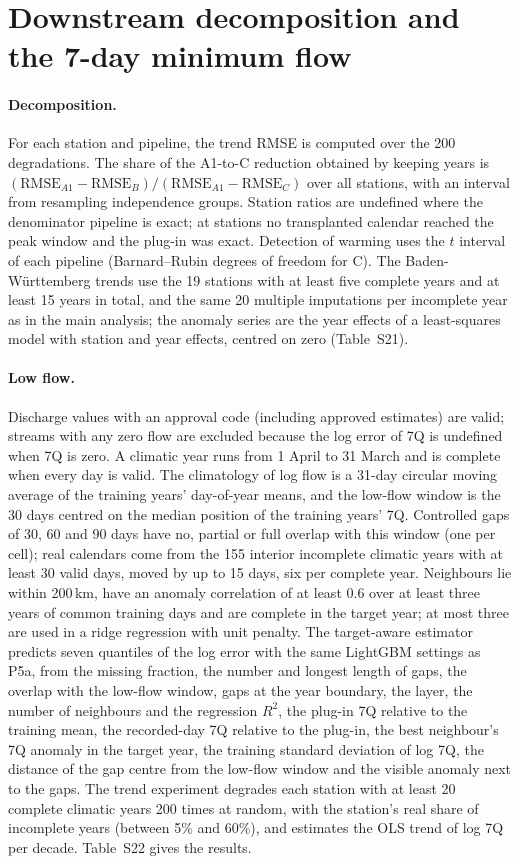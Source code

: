 \documentclass[draft]{agujournal2025}
\begin{document}
\section{Downstream decomposition and the 7-day minimum flow}
\paragraph{Decomposition.} For each station and pipeline, the trend RMSE is computed over the 200 degradations. The share of the A1-to-C reduction obtained by keeping years is $(\mathrm{RMSE}_{A1}-\mathrm{RMSE}_{B})/(\mathrm{RMSE}_{A1}-\mathrm{RMSE}_{C})$ over all stations, with an interval from resampling independence groups. Station ratios are undefined where the denominator pipeline is exact; at \TNStationsBExact{} stations no transplanted calendar reached the peak window and the plug-in was exact. Detection of warming uses the $t$ interval of each pipeline (Barnard--Rubin degrees of freedom for C). The Baden-W\"urttemberg trends use the 19 stations with at least five complete years and at least 15 years in total, and the same 20 multiple imputations per incomplete year as in the main analysis; the anomaly series are the year effects of a least-squares model with station and year effects, centred on zero (Table~S21).

\paragraph{Low flow.} Discharge values with an approval code (including approved estimates) are valid; streams with any zero flow are excluded because the log error of 7Q is undefined when 7Q is zero. A climatic year runs from 1 April to 31 March and is complete when every day is valid. The climatology of log flow is a 31-day circular moving average of the training years' day-of-year means, and the low-flow window is the 30 days centred on the median position of the training years' 7Q. Controlled gaps of 30, 60 and 90 days have no, partial or full overlap with this window (one per cell); real calendars come from the 155 interior incomplete climatic years with at least 30 valid days, moved by up to 15 days, six per complete year. Neighbours lie within 200\,km, have an anomaly correlation of at least 0.6 over at least three years of common training days and are complete in the target year; at most three are used in a ridge regression with unit penalty. The target-aware estimator predicts seven quantiles of the log error with the same LightGBM settings as P5a, from the missing fraction, the number and longest length of gaps, the overlap with the low-flow window, gaps at the year boundary, the layer, the number of neighbours and the regression $R^2$, the plug-in 7Q relative to the training mean, the recorded-day 7Q relative to the plug-in, the best neighbour's 7Q anomaly in the target year, the training standard deviation of log 7Q, the distance of the gap centre from the low-flow window and the visible anomaly next to the gaps. The trend experiment degrades each station with at least 20 complete climatic years 200 times at random, with the station's real share of incomplete years (between 5\% and 60\%), and estimates the OLS trend of log 7Q per decade. Table~S22 gives the results.

\clearpage



\end{document}
